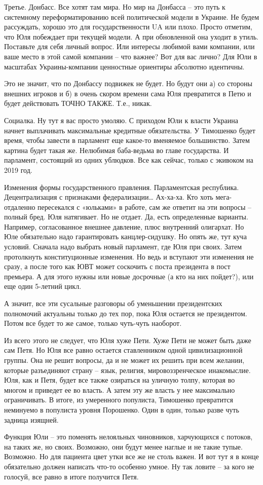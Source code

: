 Третье. Донбасс. Все хотят там мира. Но мир на Донбасса – это путь к системному
переформатированию всей политической модели в Украине. Не будем рассуждать,
хорошо это для государственности UA или плохо. Просто отметим, что Юля
побеждает при текущей модели. А при обновленной она уходит в утиль. Поставьте
для себя личный вопрос. Или интересы любимой вами компании, или ваше место в
этой самой компании – что важнее? Вот для вас лично? Для Юли в масштабах
Украины-компании ценностные ориентиры абсолютно идентичны.

Это не значит, что по Донбассу подвижек не будет. Но будут они а) со стороны
внешних игроков и б) в очень скором времени сама Юля превратится в Петю и будет
действовать ТОЧНО ТАКЖЕ. Т.е., никак.

Социалка. Ну тут я вас просто умоляю. С приходом Юли к власти Украина начнет
выплачивать максимальные кредитные обязательства. У Тимошенко будет время,
чтобы завести в парламент еще какое-то вменяемое большинство. Затем картина
будет такая же. Нелюбимая баба-ведьма во главе государства. И парламент,
состоящий из одних ублюдков. Все как сейчас, только с экивоком на 2019 год.

Изменения формы государственного правления. Парламентская республика.
Децентрализация с признаками федерализации… Ах-ха-ха. Кто хоть мега-отдаленно
пересекался с «юльками» в работе, сам же ответит на эти вопросы – полный бред.
Юля натягивает. Но не отдает. Да, есть определенные варианты. Например,
согласованное внешнее давление, плюс внутренний олигархат. Но Юле обязательно
надо гарантировать канцлер-сидушку. Но опять же, тут куча условий. Сначала надо
выбрать новый парламент, где Юля при своих. Затем протолкнуть конституционные
изменения. Но ведь и вступают эти изменения не сразу, а после того как ЮВТ
может соскочить с поста президента в пост премьера. А для этого нужны или новые
досрочные (а кто на них пойдет?), или еще один 5-летний цикл.

А значит, все эти сусальные разговоры об уменьшении президентских полномочий
актуальны только до тех пор, пока Юля остается не президентом. Потом все будет
то же самое, только чуть-чуть наоборот.

Из всего этого не следует, что Юля хуже Пети. Хуже Пети не может быть даже сам
Петя. Но Юля все равно остается ставленником одной цивилизационной группы. Она
не решит вопросы, да и не может их решить при всем желании, которые разъединяют
страну – язык, религия, мировоззренческое инакомыслие. Юля, как и Петя, будет
все также озираться на уличную толпу, которая во многом и приведет ее во
власть. А затем эту же власть у нее максимально ограничивать. В итоге, из
умеренного популиста, Тимошенко превратится неминуемо в популиста уровня
Порошенко. Один в один, только разве чуть задница изящней.

Функция Юли – это поменять нелояльных чиновников, харчующихся с потоков, на
таких же, но своих. Возможно, они будут менее наглые и не такие тупые.
Возможно. Но для пациента цвет утки все же не столь важен. И вот тут я в конце
обязательно должен написать что-то особенно умное. Ну так ловите – за кого не
голосуй, все равно в итоге получится Петя.

